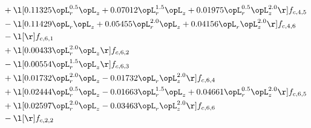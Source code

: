 \begin{alignat}{2}
& + \l[  0.11325 \opL_r^{0.5} \opL_z +  0.07012 \opL_r^{1.5} \opL_z +  0.01975 \opL_r^{0.5} \opL_z^{2.0}  \r] f_{c,4,5} \nonumber \\ 
& - \l[  0.11429 \opL_r \opL_z +  0.05455 \opL_r^{2.0} \opL_z +  0.04156 \opL_r \opL_z^{2.0}  \r] f_{c,4,6} \nonumber \\ 
& - \l[  \r] f_{c,6,1} \nonumber \\ 
& + \l[  0.00433 \opL_r^{2.0} \opL_z  \r] f_{c,6,2} \nonumber \\ 
& - \l[  0.00554 \opL_r^{1.5} \opL_z  \r] f_{c,6,3} \nonumber \\ 
& + \l[  0.01732 \opL_r^{2.0} \opL_z   -0.01732 \opL_r \opL_z^{2.0}  \r] f_{c,6,4} \nonumber \\ 
& + \l[  0.02444 \opL_r^{0.5} \opL_z   -0.01663 \opL_r^{1.5} \opL_z +  0.04661 \opL_r^{0.5} \opL_z^{2.0}  \r] f_{c,6,5} \nonumber \\ 
& + \l[  0.02597 \opL_r^{2.0} \opL_z   -0.03463 \opL_r \opL_z^{2.0}  \r] f_{c,6,6} \nonumber \\ 
& - \l[  \r] f_{c,2,2} \nonumber \\ 
\end{alignat} 


